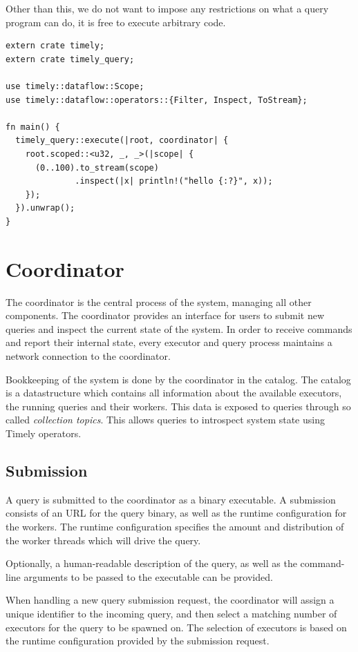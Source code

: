 Other than this, we do not want to impose any restrictions on what a query program
can do, it is free to execute arbitrary code.

\begin{lstlisting}[caption={[Example query.]Example query which prints out a stream of integers.}]
extern crate timely;
extern crate timely_query;

use timely::dataflow::Scope;
use timely::dataflow::operators::{Filter, Inspect, ToStream};

fn main() {
  timely_query::execute(|root, coordinator| {
    root.scoped::<u32, _, _>(|scope| {
      (0..100).to_stream(scope)
              .inspect(|x| println!("hello {:?}", x));
    });
  }).unwrap();
}
\end{lstlisting}

\section{Coordinator}

The coordinator is the central process of the system, managing all other
components. 
The coordinator provides an interface for users to submit new queries and
inspect the current state of the system. In order to receive commands and
report their internal state, every executor and query process maintains a
network connection to the coordinator.

Bookkeeping of the system is done by the coordinator in the catalog. The
catalog is a datastructure which contains all information about the available
executors, the running queries and their workers. This data is exposed to
queries through so called \emph{collection topics}. This allows queries
to introspect system state using Timely operators.

\subsection{Submission}

A query is submitted to the coordinator as a binary executable. A submission
consists of an URL for the query binary, as well as the runtime
configuration for the workers. The runtime configuration specifies the amount
and distribution of the worker threads which will drive the query.

Optionally, a human-readable description of the query,
as well as the command-line arguments to be passed to the executable can be
provided.

When handling a new query submission request, the coordinator will assign a
unique identifier to the incoming query, and then select a
matching number of executors for the query to be spawned on. The selection
of executors is based on the runtime configuration provided by the submission
request.

